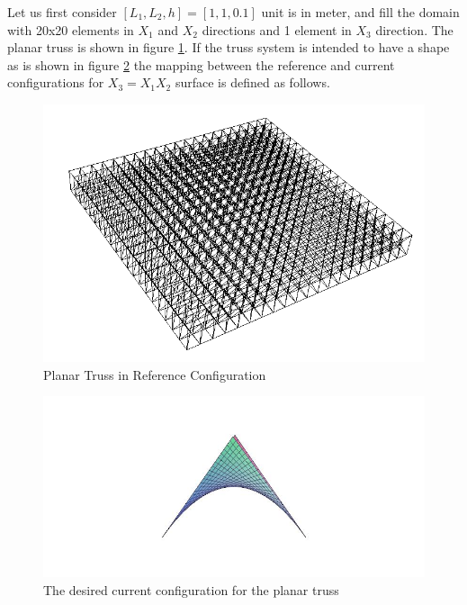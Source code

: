 Let us first consider $[L_1,L_2,h]=[1,1,0.1]$ unit is in meter, and fill the domain with 20x20 elements in $X_1$ and $X_2$ directions and 1 element in $X_3$ direction. 
The planar truss is shown in figure \ref{fig:planar_truss_ref_config}.  
If the truss system is intended to have a shape as is shown in figure \ref{fig:xy_plane_desired_shape} the mapping between the reference and current configurations for $X_3=X_1 X_2$ surface is defined as follows.

\begin{figure} 
\centering
\includegraphics[width=5.0in]{./chap_5_active_trusses/images_space_filler/planar_truss_ref_config.png}
\caption{Planar Truss in Reference Configuration}
\label{fig:planar_truss_ref_config}
\end{figure}

\begin{figure} 
\centering
\includegraphics[width=5.0in]{./chap_5_active_trusses/images_space_filler/xy_plane_desired_shape.jpg}
\caption{The desired current configuration for the planar truss}
\label{fig:xy_plane_desired_shape}
\end{figure}

